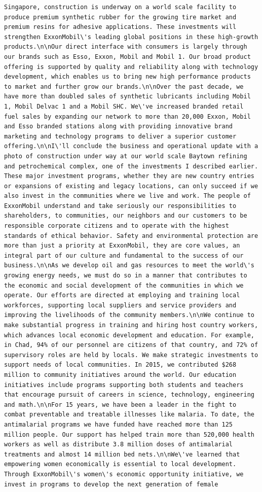 \documentclass[
  letterpaper,
  DIV=11,
  numbers=noendperiod]{scrreprt}
\begin{document}
\begin{verbatim}
Singapore, construction is underway on a world scale facility to produce premium synthetic rubber for the growing tire market and premium resins for adhesive applications. These investments will strengthen ExxonMobil\'s leading global positions in these high-growth products.\n\nOur direct interface with consumers is largely through our brands such as Esso, Exxon, Mobil and Mobil 1. Our broad product offering is supported by quality and reliability along with technology development, which enables us to bring new high performance products to market and further grow our brands.\n\nOver the past decade, we have more than doubled sales of synthetic lubricants including Mobil 1, Mobil Delvac 1 and a Mobil SHC. We\'ve increased branded retail fuel sales by expanding our network to more than 20,000 Exxon, Mobil and Esso branded stations along with providing innovative brand marketing and technology programs to deliver a superior customer offering.\n\nI\'ll conclude the business and operational update with a photo of construction under way at our world scale Baytown refining and petrochemical complex, one of the investments I described earlier. These major investment programs, whether they are new country entries or expansions of existing and legacy locations, can only succeed if we also invest in the communities where we live and work. The people of ExxonMobil understand and take seriously our responsibilities to shareholders, to communities, our neighbors and our customers to be responsible corporate citizens and to operate with the highest standards of ethical behavior. Safety and environmental protection are more than just a priority at ExxonMobil, they are core values, an integral part of our culture and fundamental to the success of our business.\n\nAs we develop oil and gas resources to meet the world\'s growing energy needs, we must do so in a manner that contributes to the economic and social development of the communities in which we operate. Our efforts are directed at employing and training local workforces, supporting local suppliers and service providers and improving the livelihoods of the community members.\n\nWe continue to make substantial progress in training and hiring host country workers, which advances local economic development and education. For example, in Chad, 94% of our personnel are citizens of that country, and 72% of supervisory roles are held by locals. We make strategic investments to support needs of local communities. In 2015, we contributed $268 million to community initiatives around the world. Our education initiatives include programs supporting both students and teachers that encourage pursuit of careers in science, technology, engineering and math.\n\nFor 15 years, we have been a leader in the fight to combat preventable and treatable illnesses like malaria. To date, the antimalarial programs we have funded have reached more than 125 million people. Our support has helped train more than 520,000 health workers as well as distribute 3.8 million doses of antimalarial treatments and almost 14 million bed nets.\n\nWe\'ve learned that empowering women economically is essential to local development. Through ExxonMobil\'s women\'s economic opportunity initiative, we invest in programs to develop the next generation of female 
\end{verbatim}
\end{document}
